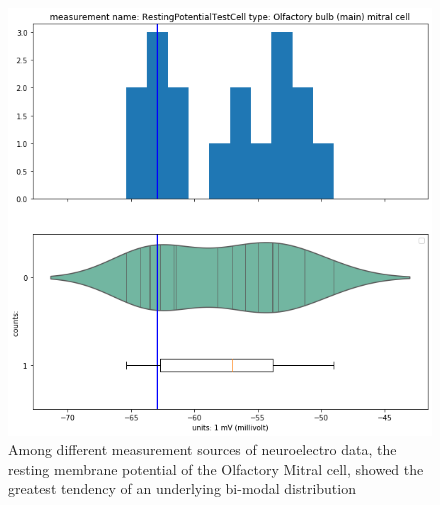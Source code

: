\begin{center}     
      \begin{figure}  
  \includegraphics[width=0.7\linewidth]{notebooks_converted/needata_thesis_files/needata_thesis_5_22}
      \caption{Among different measurement sources of neuroelectro data, the resting membrane potential of the Olfactory Mitral cell, showed the greatest tendency of an underlying bi-modal distribution}
      \end{figure}
\end{center}     

